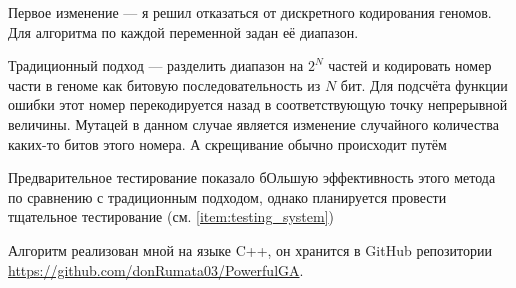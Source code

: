 Первое изменение — я решил отказаться от дискретного кодирования геномов.
Для алгоритма по каждой переменной задан её диапазон.

Традиционный подход — разделить диапазон на $2^N$ частей и кодировать номер части в геноме как битовую последовательность из $N$ бит.
Для подсчёта функции ошибки этот номер перекодируется назад в соответствующую точку непрерывной величины.
Мутацей в данном случае является изменение случайного количества каких-то битов этого номера.
А скрещивание обычно происходит путём

Предварительное тестирование показало бОльшую эффективность этого метода по сравнению с традиционным подходом, однако планируется провести тщательное тестирование (см. \ref{item:testing_system})

Алгоритм реализован мной на языке C++, он хранится в GitHub репозитории \href{https://github.com/donRumata03/PowerfulGA}{https://github.com/donRumata03/PowerfulGA}.